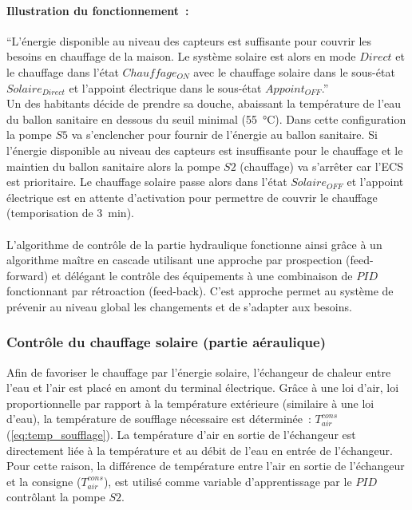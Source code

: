 \paragraph{Illustration du fonctionnement~:} %
\label{par:illustration_du_fonctionnement_}
\enquote{L’énergie disponible au niveau des capteurs est suffisante pour couvrir les besoins en chauffage de
la maison. Le système solaire est alors en mode $Direct$ et le chauffage dans l’état
$Chauffage_{ON}$ avec le chauffage solaire dans le sous-état $Solaire_{Direct}$ et
l’appoint électrique dans le sous-état $Appoint_{OFF}$.} \\
Un des habitants décide de prendre sa douche, abaissant la température de l’eau du ballon
sanitaire en dessous du seuil minimal (\SI{55}{\celsius}). Dans cette configuration la
pompe $S5$ va s’enclencher pour fournir de l’énergie au ballon sanitaire. Si l’énergie
disponible au niveau des capteurs est insuffisante pour le chauffage et le maintien du
ballon sanitaire alors la pompe $S2$ (chauffage) va s’arrêter car l’ECS est prioritaire.
Le chauffage solaire passe alors dans l’état $Solaire_{OFF}$ et l’appoint électrique est
en attente d’activation pour permettre de couvrir le chauffage (temporisation de
\SI{3}{\minute}).

\paragraph{} %
\label{par:conclusion_algo}
L’algorithme de contrôle de la partie hydraulique fonctionne ainsi grâce à un algorithme
maître en cascade utilisant une approche par prospection (feed-forward) et délégant le
contrôle des équipements à une combinaison de $PID$ fonctionnant par rétroaction (feed-back).
C’est approche permet au système de prévenir au niveau global les changements et de
s’adapter aux besoins.


\subsubsection{Contrôle du chauffage solaire (partie aéraulique)} %
\label{ssub:controle_du_chauffage_solaire}
Afin de favoriser le chauffage par l’énergie solaire, l’échangeur de chaleur entre l’eau
et l’air est placé en amont du terminal électrique. Grâce à une loi d’air, loi
proportionnelle par rapport à la température extérieure (similaire à une loi d’eau), la
température de soufflage nécessaire est déterminée~: $T_{air}^{cons}$ (\autoref{eq:temp_soufflage}).
La température d’air en sortie de l’échangeur est directement liée à la température et au
débit de l’eau en entrée de l’échangeur. Pour cette raison, la différence de température
entre l’air en sortie de l’échangeur et la consigne ($T_{air}^{cons}$), est utilisé comme
variable d’apprentissage par le $PID$ contrôlant la pompe $S2$.

